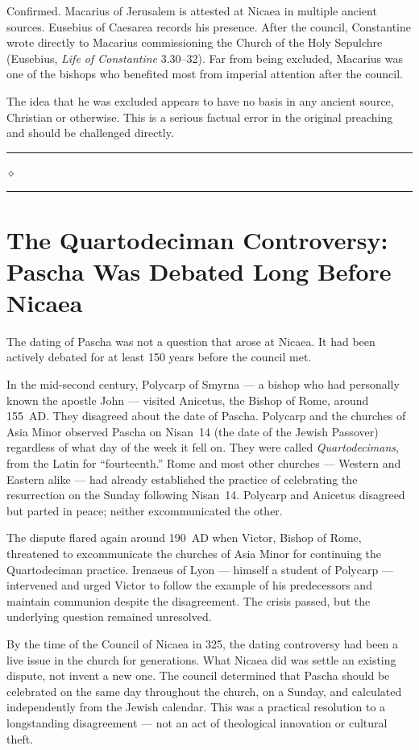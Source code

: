 \documentclass[10pt,twoside,openany]{book}
\newcommand{\ornrule}{%
  \par\bigskip
  {\noindent\hfil{\color{gold}\rule[0.5ex]{1.5in}{0.5pt}%
  \quad$\diamond$\quad%
  \rule[0.5ex]{1.5in}{0.5pt}}\hfil\par}%
  \bigskip
}
\begin{document}
\begin{reviewerbox}
Confirmed. Macarius of Jerusalem is attested at Nicaea
in multiple ancient sources. Eusebius of Caesarea
records his presence. After the council, Constantine
wrote directly to Macarius commissioning the Church of
the Holy Sepulchre (Eusebius, \emph{Life of Constantine}
3.30--32). Far from being excluded, Macarius was one of
the bishops who benefited most from imperial attention
after the council.

The idea that he was excluded appears to have no basis
in any ancient source, Christian or otherwise. This is
a serious factual error in the original preaching and
should be challenged directly.
\end{reviewerbox}

\ornrule



\section{The Quartodeciman Controversy: Pascha Was Debated Long Before Nicaea}

The dating of Pascha was not a question that arose at Nicaea. It had
been actively debated for at least 150 years before the council met.

In the mid-second century, Polycarp of Smyrna --- a bishop who had
personally known the apostle John --- visited Anicetus, the Bishop of
Rome, around 155~AD. They disagreed about the date of Pascha.
Polycarp and the churches of Asia Minor observed Pascha on Nisan~14
(the date of the Jewish Passover) regardless of what day of the week
it fell on. They were called \emph{Quartodecimans}, from the Latin for
``fourteenth.'' Rome and most other churches --- Western and Eastern alike --- had already
established the practice of celebrating the resurrection on the Sunday
following Nisan~14. Polycarp and Anicetus disagreed but parted in
peace; neither excommunicated the other.

The dispute flared again around 190~AD when Victor, Bishop of Rome,
threatened to excommunicate the churches of Asia Minor for continuing
the Quartodeciman practice. Irenaeus of Lyon --- himself a student of
Polycarp --- intervened and urged Victor to follow the example of his
predecessors and maintain communion despite the disagreement. The
crisis passed, but the underlying question remained unresolved.

By the time of the Council of Nicaea in 325, the dating controversy
had been a live issue in the church for generations. What Nicaea did
was settle an existing dispute, not invent a new one. The council
determined that Pascha should be celebrated on the same day throughout
the church, on a Sunday, and calculated independently from the Jewish
calendar. This was a practical resolution to a longstanding
disagreement --- not an act of theological innovation or cultural theft.
\end{document}
